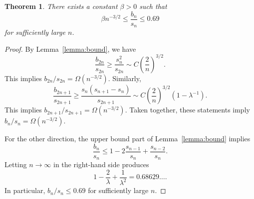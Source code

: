 \documentclass[10pt,a4paper]{amsart}
\newtheorem{theorem}{Theorem}
\begin{document}
\begin{theorem}
    There exists a constant $\beta > 0$ such that
    \begin{equation*}
        \beta n^{-3/2} \leq \frac{b_n}{s_n} \leq 0.69
    \end{equation*}
    for sufficiently large $n$.
\end{theorem}

\begin{proof}
    By Lemma~\ref{lemma:bound}, we have
    \begin{equation*}
        \frac{b_{2n}}{s_{2n}} \geq \frac{s_n^2}{s_{2n}} \sim C \left(\frac{2}{n}\right)^{3/2}.
    \end{equation*}
    This implies $b_{2n} / s_{2n} = \Omega(n^{-3/2})$. Similarly,
    \begin{equation*}
        \frac{b_{2n + 1}}{s_{2n + 1}} \geq \frac{s_n(s_{n + 1} - s_n)}{s_{2n + 1}}
        \sim C \left( \frac{2}{n} \right)^{3/2} (1 - \lambda^{-1}).
    \end{equation*}
    This implies $b_{2n + 1} / s_{2n + 1} = \Omega(n^{-3/2})$. Taken together,
    these statements imply $b_n / s_n = \Omega(n^{-3/2})$.

    For the other direction, the upper bound part of Lemma~\ref{lemma:bound}
    implies
    \begin{equation*}
        \frac{b_n}{s_n} \leq 1 - 2\frac{s_{n - 1}}{s_n} + \frac{s_{n - 2}}{s_n}.
    \end{equation*}
    Letting $n \to \infty$ in the right-hand side produces
    \begin{equation*}
        1 - \frac{2}{\lambda} + \frac{1}{\lambda^2} = 0.68629\dots.
    \end{equation*}
    In particular, $b_n / s_n \leq 0.69$ for sufficiently large $n$.
\end{proof}
\end{document}
